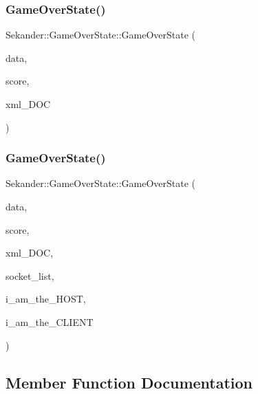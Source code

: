 \subsubsection{\texorpdfstring{Game\+Over\+State()}{GameOverState()}\hspace{0.1cm}{\footnotesize\ttfamily [2/3]}}
{\footnotesize\ttfamily Sekander\+::\+Game\+Over\+State\+::\+Game\+Over\+State (\begin{DoxyParamCaption}\item[{\hyperlink{namespaceSekander_a1d69b002ba2d23020901c28f0def5e16}{Game\+Data\+Ref}}]{data,  }\item[{int}]{score,  }\item[{const char $\ast$}]{xml\+\_\+\+D\+OC }\end{DoxyParamCaption})}

\mbox{\label{classSekander_1_1GameOverState_aa856c012e9c97ac48360e089d39f0fb5}} 
\subsubsection{\texorpdfstring{Game\+Over\+State()}{GameOverState()}\hspace{0.1cm}{\footnotesize\ttfamily [3/3]}}
{\footnotesize\ttfamily Sekander\+::\+Game\+Over\+State\+::\+Game\+Over\+State (\begin{DoxyParamCaption}\item[{\hyperlink{namespaceSekander_a1d69b002ba2d23020901c28f0def5e16}{Game\+Data\+Ref}}]{data,  }\item[{int}]{score,  }\item[{const char $\ast$}]{xml\+\_\+\+D\+OC,  }\item[{std\+::vector$<$ sf\+::\+Tcp\+Socket $\ast$$>$}]{socket\+\_\+list,  }\item[{bool}]{i\+\_\+am\+\_\+the\+\_\+\+H\+O\+ST,  }\item[{bool}]{i\+\_\+am\+\_\+the\+\_\+\+C\+L\+I\+E\+NT }\end{DoxyParamCaption})}



\subsection{Member Function Documentation}
\mbox{\label{classSekander_1_1GameOverState_a577c6f01f9d687d772cefd17c2643e5f}} 
